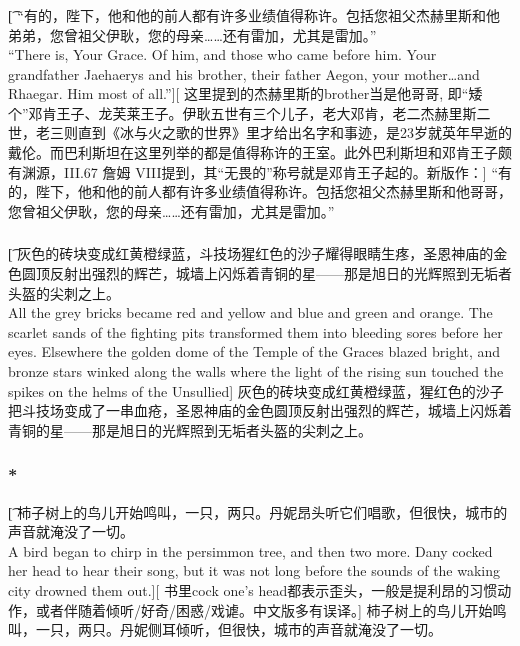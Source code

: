 \documentclass[12pt,a4paper]{article}
\begin{document}
\subsubsection{}\t[
	“有的，陛下，他和他的前人都有许多业绩值得称许。包括您祖父杰赫里斯和他弟弟，您曾祖父伊耿，您的母亲……还有雷加，尤其是雷加。”\\
	“There is, Your Grace. Of him, and those who came before him. Your grandfather Jaehaerys and his brother, their father Aegon, your mother\ldots and Rhaegar. Him most of all.”][
	这里提到的杰赫里斯的brother当是他哥哥, 即“矮个”邓肯王子、龙芙莱王子。伊耿五世有三个儿子，老大邓肯，老二杰赫里斯二世，老三则直到《冰与火之歌的世界》里才给出名字和事迹，是23岁就英年早逝的戴伦。而巴利斯坦在这里列举的都是值得称许的王室。此外巴利斯坦和邓肯王子颇有渊源，III.67 詹姆 VIII提到，其“无畏的”称号就是邓肯王子起的。新版作：]
	“有的，陛下，他和他的前人都有许多业绩值得称许。包括您祖父杰赫里斯和他哥哥，您曾祖父伊耿，您的母亲……还有雷加，尤其是雷加。”
	
\subsubsection{}\t[
	灰色的砖块变成红黄橙绿蓝，斗技场猩红色的沙子耀得眼睛生疼，圣恩神庙的金色圆顶反射出强烈的辉芒，城墙上闪烁着青铜的星——那是旭日的光辉照到无垢者头盔的尖刺之上。\\
	All the grey bricks became red and yellow and blue and green and orange. The scarlet sands of the fighting pits transformed them into bleeding sores before her eyes. Elsewhere the golden dome of the Temple of the Graces blazed bright, and bronze stars winked along the walls where the light of the rising sun touched the spikes on the helms of the Unsullied]
	灰色的砖块变成红黄橙绿蓝，猩红色的沙子把斗技场变成了一串血疮，圣恩神庙的金色圆顶反射出强烈的辉芒，城墙上闪烁着青铜的星——那是旭日的光辉照到无垢者头盔的尖刺之上。
	
\subsubsection{\color{red}*}\t[	
	柿子树上的鸟儿开始鸣叫，一只，两只。丹妮昂头听它们唱歌，但很快，城市的声音就淹没了一切。\\
	A bird began to chirp in the persimmon tree, and then two more. Dany cocked her head to hear their song, but it was not long before the sounds of the waking city drowned them out.][
	书里cock one's head都表示歪头，一般是提利昂的习惯动作，或者伴随着倾听/好奇/困惑/戏谑。中文版多有误译。]
	柿子树上的鸟儿开始鸣叫，一只，两只。丹妮侧耳倾听，但很快，城市的声音就淹没了一切。
	
\end{document}
